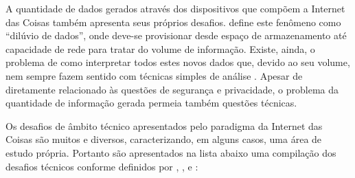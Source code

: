 \documentclass[twoside,english,brazilian]{UNISINOSmonografia}
\begin{document}
A quantidade de dados gerados através dos dispositivos que compõem a Internet 
das Coisas também apresenta seus próprios desafios. 
 define este fenômeno como ``dilúvio de dados'', onde 
deve-se provisionar desde espaço de armazenamento até capacidade de rede para 
tratar do volume de informação. Existe, ainda, o problema de como interpretar 
todos estes novos dados que, devido ao seu volume, nem sempre fazem sentido 
com técnicas simples de análise \cite{ITU2005}.
Apesar de diretamente relacionado às questões de segurança e privacidade, o 
problema da quantidade de informação gerada permeia também questões técnicas.


Os desafios de âmbito técnico apresentados pelo paradigma da Internet das 
Coisas são muitos e diversos, caracterizando, em alguns casos, uma área de 
estudo própria. Portanto são apresentados na lista abaixo uma compilação dos 
desafios técnicos conforme definidos por 
, 
, 
 e 
:
\end{document}
